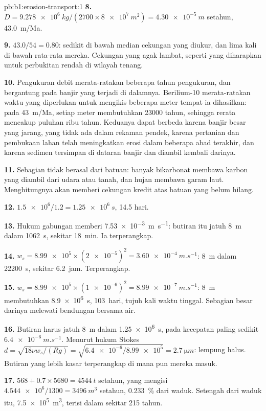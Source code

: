 \begin{solution}{pb:b1:erosion-transport:1}
\textbf{8.} $D = \qty{9.278e6}{kg}/(2700 \times \qty{8e7}{m^2}) =
\qty{4.30e-5}{m}$ setahun, \qty{43.0}{m/Ma}.

\textbf{9.} $43.0/54 = 0.80$: sedikit di bawah median cekungan yang diukur, dan lima
kali di bawah rata-rata mereka. Cekungan yang agak lambat, seperti yang diharapkan
untuk perbukitan rendah di wilayah tenang.

\textbf{10.} Pengukuran debit merata-ratakan beberapa tahun pengukuran, dan bergantung
pada banjir yang terjadi di dalamnya. Berilium-10 merata-ratakan waktu yang diperlukan
untuk mengikis beberapa meter tempat ia dihasilkan: pada \qty{43}{m/Ma}, setiap meter
membutuhkan \num{23000} tahun, sehingga rerata mencakup puluhan ribu tahun. Keduanya
dapat berbeda karena banjir besar yang jarang, yang tidak ada dalam rekaman pendek,
karena pertanian dan pembukaan lahan telah meningkatkan erosi dalam beberapa abad
terakhir, dan karena sedimen tersimpan di dataran banjir dan diambil kembali darinya.

\textbf{11.} Sebagian  tidak berasal dari batuan: banyak bikarbonat
membawa karbon yang diambil dari udara atau tanah, dan hujan membawa garam laut.
Menghitungnya akan memberi cekungan kredit atas batuan yang belum hilang.

\textbf{12.} $\num{1.5e6}/1.2 = \qty{1.25e6}{s}$, \num{14.5} hari.

\textbf{13.} Hukum gabungan memberi \qty{7.53e-3}{m.s^{-1}}: butiran itu jatuh
\qty{8}{m} dalam \qty{1062}{s}, sekitar \qty{18}{min}. Ia terperangkap.

\textbf{14.} $w_s = \num{8.99e5} \times (\num{2e-5})^2 =
\qty{3.60e-4}{m.s^{-1}}$: \qty{8}{m} dalam \qty{22200}{s}, sekitar \num{6.2}~jam.
Terperangkap.

\textbf{15.} $w_s = \num{8.99e5} \times (\num{1e-6})^2 =
\qty{8.99e-7}{m.s^{-1}}$: \qty{8}{m} membutuhkan \qty{8.9e6}{s}, \num{103}~hari, tujuh
kali waktu tinggal. Sebagian besar darinya melewati bendungan bersama air.

\textbf{16.} Butiran harus jatuh \qty{8}{m} dalam \qty{1.25e6}{s}, pada kecepatan
paling sedikit $\qty{6.4e-6}{m.s^{-1}}$. Menurut hukum Stokes $d = \sqrt{18\nu
w_s/(Rg)} = \sqrt{\num{6.4e-6}/\num{8.99e5}} = \qty{2.7}{\micro m}$: lempung halus.
Butiran yang lebih kasar terperangkap di mana pun mereka masuk.

\textbf{17.} $568 + 0.7 \times 5680 = \qty{4544}{t}$ setahun, yang mengisi
$\num{4.544e6}/1300 = \qty{3496}{m^3}$ setahun, \qty{0.233}{\percent} dari waduk.
Setengah dari waduk itu, \qty{7.5e5}{m^3}, terisi dalam sekitar \num{215} tahun.


\end{solution}
